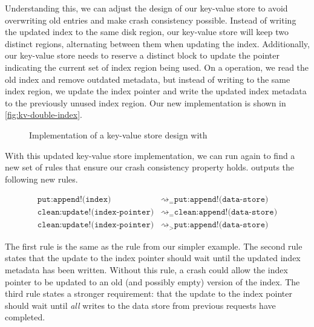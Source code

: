 Understanding this, we can adjust the design of our key-value store to avoid overwriting old entries
and make crash consistency possible. Instead of writing the updated index to the same disk region,
our key-value store will keep two distinct regions, alternating between them when updating the
index. Additionally, our key-value store needs to reserve a distinct block to update the pointer
indicating the current set of index region being used. On a \clean operation, we read the old index
and remove outdated metadata, but instead of writing to the same index region, we update the index
pointer and write the updated index metadata to the previously unused index region. Our new
implementation is shown in \autoref{fig:kv-double-index}.

\begin{figure}[h]
  \centering
  \vspace{-.5em}
  \caption{Implementation of a key-value store design with \clean}
  \label{fig:kv-double-index}
\end{figure}

With this updated key-value store implementation, we can run \depsynth again to find a new set of
rules that ensure our crash consistency property holds. \depsynth outputs the following new rules.

\begin{align*}
  \texttt{put:append!(index)} &\rightsquigarrow_= \texttt{put:append!(data-store)} \\
  \texttt{clean:update!(index-pointer)} &\rightsquigarrow_= \texttt{clean:append!(data-store)} \\
  \texttt{clean:update!(index-pointer)} &\rightsquigarrow_> \texttt{put:append!(data-store)}
\end{align*}

The first rule is the same as the rule from our simpler example.
The second rule states that the update to the index pointer should wait until the updated
index metadata has been written. Without this rule, a crash could allow the index pointer
to be updated to an old (and possibly empty) version of the index.
The third rule states a stronger requirement: that the update to the index pointer should
wait until \emph{all} writes to the data store from previous \putreq requests have completed.\tighten

\fi
